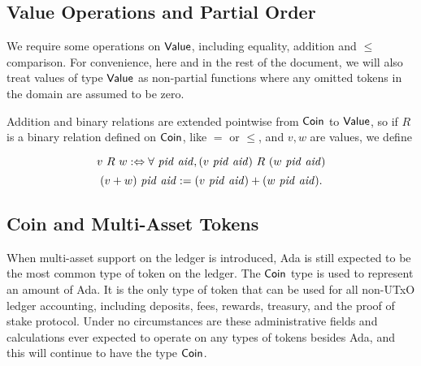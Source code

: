 \begin{itemize}

\end{itemize}

\subsection*{Value Operations and Partial Order}
We require some operations on $\mathsf{Value}$, including equality, addition and $\leq$ comparison.
For convenience, here and in the rest of the document, we
will also treat values of type $\mathsf{Value}$ as non-partial functions where
any omitted tokens in the domain are assumed to be zero.

Addition and binary relations are extended pointwise from $\mathsf{Coin}$ to $\mathsf{Value}$, so if $R$ is a binary relation defined on $\mathsf{Coin}$, like $=$ or $\leq$, and $v, w$ are values, we define

\[ v~R~w :\Leftrightarrow \forall~\mathit{pid}~\mathit{aid}, (v~\mathit{pid}~\mathit{aid})~R~(w~\mathit{pid}~\mathit{aid}) \]
\[ (v + w)~\mathit{pid}~\mathit{aid} := (v~\mathit{pid}~\mathit{aid}) + (w~\mathit{pid}~\mathit{aid}). \]

\subsection*{Coin and Multi-Asset Tokens}
When multi-asset support on the ledger is introduced, Ada is still expected to be
the most common type of token on the ledger.
The $\mathsf{Coin}$ type is used to represent an amount of Ada.
It is the only
type of token that can be used for all non-UTxO ledger accounting, including deposits,
fees, rewards, treasury, and the proof of stake protocol. Under no circumstances
are these administrative fields and calculations ever expected to operate on
any types of tokens besides Ada, and this will continue to have the type $\mathsf{Coin}$.

